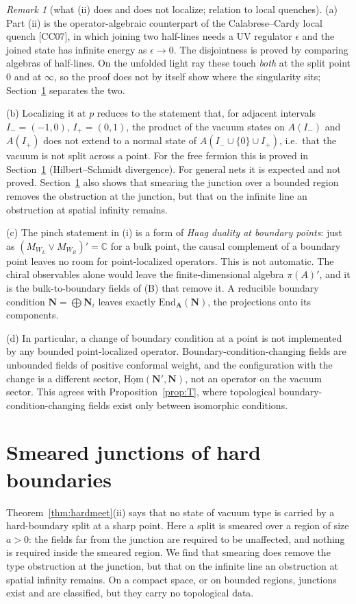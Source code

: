\documentclass[11pt]{article}
\theoremstyle{definition}
\theoremstyle{remark}
\newtheorem{remark}[theorem]{Remark}
\newcommand{\bfA}{\mathbf A}
\begin{document}
\begin{remark}[what (ii) does and does not localize; relation to local quenches]\label{rem:quench}
(a) Part (ii) is the operator-algebraic counterpart of the Calabrese--Cardy local quench [CC07], in which joining two half-lines needs a UV regulator $\epsilon$ and the joined state has infinite energy as $\epsilon\to0$. The disjointness is proved by comparing algebras of half-lines. On the unfolded light ray these touch \emph{both} at the split point $0$ and at $\infty$, so the proof does not by itself show where the singularity sits; Section~\ref{sec:smeared} separates the two.

(b) Localizing it at $p$ reduces to the statement that, for adjacent intervals $I_-=(-1,0)$, $I_+=(0,1)$, the product of the vacuum states on $A(I_-)$ and $A(I_+)$ does not extend to a normal state of $A(I_-\cup\{0\}\cup I_+)$, i.e.\ that the vacuum is not split across a point. For the free fermion this is proved in Section~\ref{sec:smeared} (Hilbert--Schmidt divergence). For general nets it is expected and not proved. Section~\ref{sec:smeared} also shows that smearing the junction over a bounded region removes the obstruction at the junction, but that on the infinite line an obstruction at spatial infinity remains.

(c) The pinch statement in (i) is a form of \emph{Haag duality at boundary points}: just as $(M_{W_L}\vee M_{W_R})'=\mathbb C$ for a bulk point, the causal complement of a boundary point leaves no room for point-localized operators. This is not automatic. The chiral observables alone would leave the finite-dimensional algebra $\pi(A)'$, and it is the bulk-to-boundary fields of (B) that remove it. A reducible boundary condition $\mathbf N=\bigoplus\mathbf N_i$ leaves exactly $\mathrm{End}_{\bfA}(\mathbf N)$, the projections onto its components.

(d) In particular, a change of boundary condition at a point is not implemented by any bounded point-localized operator. Boundary-condition-changing fields are unbounded fields of positive conformal weight, and the configuration with the change is a different sector, $\underline{\mathrm{Hom}}(\mathbf N',\mathbf N)$, not an operator on the vacuum sector. This agrees with Proposition~\ref{prop:T}, where topological boundary-condition-changing fields exist only between isomorphic conditions.
\end{remark}

\section{Smeared junctions of hard boundaries}\label{sec:smeared}
Theorem~\ref{thm:hardmeet}(ii) says that no state of vacuum type is carried by a hard-boundary split at a sharp point. Here a split is smeared over a region of size $a>0$: the fields far from the junction are required to be unaffected, and nothing is required inside the smeared region. We find that smearing does remove the type obstruction at the junction, but that on the infinite line an obstruction at spatial infinity remains. On a compact space, or on bounded regions, junctions exist and are classified, but they carry no topological data.
\end{document}
